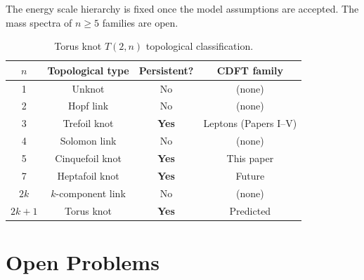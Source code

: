 \documentclass[11pt]{article}
\begin{document}
The energy scale hierarchy is fixed once the model assumptions are accepted.
The mass spectra of $n \geq 5$ families are open.

\begin{table}[h]
  \caption{Torus knot $T(2,n)$ topological classification.}
  \label{tab:classification}
  \begin{tabular}{cccc}
    \toprule
    $n$ & Topological type & Persistent? & CDFT family \\
    \midrule
    1 & Unknot & No & (none) \\
    2 & Hopf link & No & (none) \\
    3 & Trefoil knot & \textbf{Yes} & Leptons (Papers I--V) \\
    4 & Solomon link & No & (none) \\
    5 & Cinquefoil knot & \textbf{Yes} & This paper \\
    7 & Heptafoil knot & \textbf{Yes} & Future \\
    $2k$ & $k$-component link & No & (none) \\
    $2k+1$ & Torus knot & \textbf{Yes} & Predicted \\
    \bottomrule
  \end{tabular}
\end{table}


\section{Open Problems}
\label{sec:open}
\end{document}
